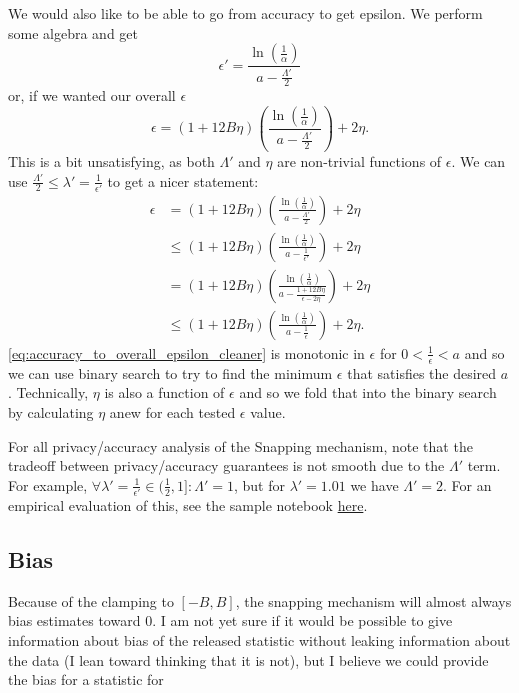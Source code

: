 \documentclass[11pt]{scrartcl} %
\begin{document}
We would also like to be able to go from accuracy to get epsilon. We perform some algebra
and get
\[ \epsilon' = \frac{\ln\left( \frac{1}{\alpha} \right)}{a - \frac{\Lambda'}{2}} \]
or, if we wanted our overall $\epsilon$
\begin{equation}
	\label{eq:accuracy_to_overall_epsilon}
	\epsilon = (1+12B\eta) \left( \frac{\ln\left( \frac{1}{\alpha} \right)}{a - \frac{\Lambda'}{2}} \right) + 2\eta.
\end{equation}
This is a bit unsatisfying, as both $\Lambda'$ and $\eta$ are non-trivial functions of $\epsilon$. 
We can use $\frac{\Lambda'}{2} \leq \lambda' = \frac{1}{\epsilon'}$ to get a nicer statement: 
\begin{align}
	\label{eq:accuracy_to_overall_epsilon_cleaner}
	\epsilon &= (1+12B\eta) \left( \frac{\ln\left( \frac{1}{\alpha} \right)}{a - \frac{\Lambda'}{2}} \right) + 2\eta \nonumber \\
			 &\leq (1 + 12B\eta) \left( \frac{\ln\left( \frac{1}{\alpha} \right)}{a - \frac{1}{\epsilon'}} \right) + 2\eta \nonumber \\
			 &= (1 + 12B\eta) \left( \frac{\ln\left( \frac{1}{\alpha} \right)}{a - \frac{1 + 12B\eta}{\epsilon - 2\eta}} \right) + 2\eta \nonumber \\
			 &\leq (1 + 12B\eta) \left( \frac{\ln\left( \frac{1}{\alpha} \right)}{a - \frac{1}{\epsilon}} \right) + 2\eta.
\end{align}
\eqref{eq:accuracy_to_overall_epsilon_cleaner} is monotonic in $\epsilon$ for $0 < \frac{1}{\epsilon} < a$ and so 
we can use binary search to try to find the minimum $\epsilon$ that satisfies the desired $a$. 
Technically, $\eta$ is also a function of $\epsilon$ and so we fold that into the binary search by 
calculating $\eta$ anew for each tested $\epsilon$ value. \newline 

For all privacy/accuracy analysis of the Snapping mechanism, note that the tradeoff between privacy/accuracy 
guarantees is not smooth due to the $\Lambda'$ term. 
For example, $\forall \lambda' = \frac{1}{\epsilon'} \in (\frac{1}{2}, 1]: \Lambda' = 1$, but for 
$\lambda' = 1.01$ we have $\Lambda' = 2$. For an empirical evaluation of this, see 
the sample notebook \href{https://github.com/opendp/smartnoise-samples/blob/cc_add_snapping/analysis/snapping_mechanism.ipynb}{here}.

\subsection{Bias}
\label{subsec:bias}
Because of the clamping to $[-B,B]$, the snapping mechanism will almost always bias estimates toward $0$.
I am not yet sure if it would be possible to give information about bias of the released statistic without leaking information
about the data (I lean toward thinking that it is not), but I believe we could provide the bias for a statistic for
\end{document}
